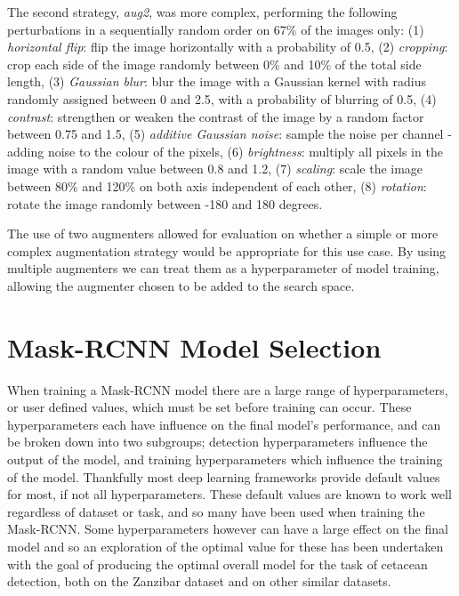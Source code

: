 The second strategy, \textit{aug2}, was more complex, performing the following perturbations in a sequentially random order on 67\% of the images only: (1) \textit{horizontal flip}: flip the image horizontally with a probability of 0.5, (2) \textit{cropping}: crop each side of the image randomly between 0\% and 10\% of the total side length, (3) \textit{Gaussian blur}: blur the image with a Gaussian kernel with radius randomly assigned between 0 and 2.5, with a probability of blurring of 0.5, (4) \textit{contrast}: strengthen or weaken the contrast of the image by a random factor between 0.75 and 1.5, (5) \textit{additive Gaussian noise}: sample the noise per channel - adding noise to the colour of the pixels, (6) \textit{brightness}: multiply all pixels in the image with a random value between 0.8 and 1.2, (7) \textit{scaling}: scale the image between 80\% and 120\% on both axis independent of each other, (8) \textit{rotation}: rotate the image randomly between -180 and 180 degrees. 

The use of two augmenters allowed for evaluation on whether a simple or more complex augmentation strategy would be appropriate for this use case. By using multiple augmenters we can treat them as a hyperparameter of model training, allowing the augmenter chosen to be added to the search space.

\section{Mask-RCNN Model Selection}\label{ch:cetDet,sec:ModelSelection}

When training a Mask-RCNN model there are a large range of hyperparameters, or user defined values, which must be set before training can occur. These hyperparameters each have influence on the final model's performance, and can be broken down into two subgroups; detection hyperparameters influence the output of the model, and training hyperparameters which influence the training of the model. Thankfully most deep learning frameworks provide default values for most, if not all hyperparameters. These default values are known to work well regardless of dataset or task, and so many have been used when training the Mask-RCNN. Some hyperparameters however can have a large effect on the final model and so an exploration of the optimal value for these has been undertaken with the goal of producing the optimal overall model for the task of cetacean detection, both on the Zanzibar dataset and on other similar datasets. 

